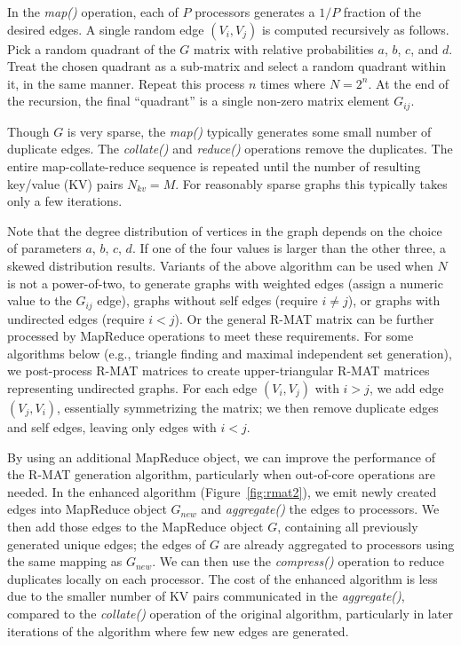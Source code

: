 In the {\it map()} operation, each of $P$ processors generates a $1/P$
fraction of the desired edges.  A single random edge $(V_i,V_j)$ is
computed recursively as follows.  Pick a random quadrant of the $G$
matrix with relative probabilities $a$, $b$, $c$, and $d$.  Treat the
chosen quadrant as a sub-matrix and select a random quadrant within
it, in the same manner.  Repeat this process $n$ times where $N =
2^n$.  At the end of the recursion, the final ``quadrant'' is a single
non-zero matrix element $G_{ij}$.

Though $G$ is very sparse, the {\it map()} typically generates some
small number of duplicate edges.  The {\it collate()} and {\it
reduce()} operations remove the duplicates.  The entire
map-collate-reduce sequence is repeated until the number of resulting
key/value (KV) pairs $N_{kv} = M$.  For reasonably sparse graphs this
typically takes only a few iterations.

Note that the degree distribution of vertices in the graph depends on
the choice of parameters $a$, $b$, $c$, $d$.  If one of the four
values is larger than the other three, a skewed distribution results.
Variants of the above algorithm can be used when $N$ is not a
power-of-two, to generate graphs with weighted edges (assign a numeric
value to the $G_{ij}$ edge), graphs without self edges (require $i \ne
j$), or graphs with undirected edges (require $i < j$).  Or the
general R-MAT matrix can be further processed by MapReduce operations
to meet these requirements.  For some algorithms below (e.g., triangle
finding and maximal independent set generation), we post-process R-MAT
matrices to create upper-triangular R-MAT matrices representing
undirected graphs.  For each edge $(V_i,V_j)$ with $i > j$, we add
edge $(V_j,V_i)$, essentially symmetrizing the matrix; we then remove
duplicate edges and self edges, leaving only edges with $i < j$.

By using an additional MapReduce object, we can improve the
performance of the R-MAT generation algorithm, particularly when
out-of-core operations are needed.  In the enhanced algorithm
(Figure~\ref{fig:rmat2}), we emit newly created edges into MapReduce
object $G_{new}$ and {\it aggregate()} the edges to processors.  We
then add those edges to the MapReduce object $G$, containing all
previously generated unique edges; the edges of $G$ are already
aggregated to processors using the same mapping as $G_{new}$.  We can
then use the {\it compress()} operation to reduce duplicates locally
on each processor.  The cost of the enhanced algorithm is less due to
the smaller number of KV pairs communicated in the {\it aggregate()},
compared to the {\it collate()} operation of the original algorithm,
particularly in later iterations of the algorithm where few new edges
are generated.

